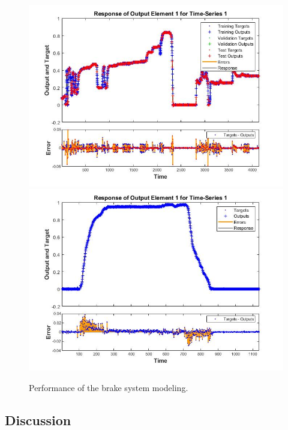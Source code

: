 \documentclass[conference]{IEEEtran}
\begin{document}
\begin{figure}[h]
	\centering
		{\includegraphics[width=0.90\linewidth]{figs/img/brake_new_neuralNetworkFig}}
		{\includegraphics[width=0.90\linewidth]{figs/img/brake_new_neuralNetworkFigLog2Test}}
	\caption{Performance of the brake system modeling.}
\end{figure}





\subsection{Discussion}
\label{sec:discussion}
\end{document}
